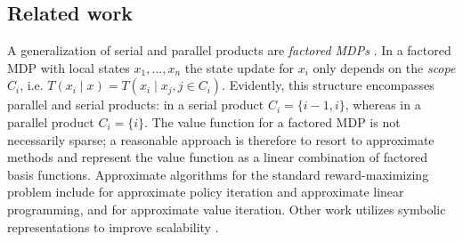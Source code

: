 \documentclass[conference]{IEEEtran}
\begin{document}

\subsection{Related work}

A generalization of serial and parallel products are \emph{factored MDPs} \cite{Boutilier2000}. In a factored MDP with local states $x_1, \ldots, x_n$ the state update for $x_i$ only depends on the \emph{scope} $C_i$, i.e. $T(x_i \mid x) = T(x_i \mid x_j, j \in C_i)$. Evidently, this structure encompasses parallel and serial products: in a serial product $C_i = \{ i-1, i \}$, whereas in a parallel product $C_i = \{ i \}$. The value function for a factored MDP is not necessarily sparse; a reasonable approach is therefore to resort to approximate methods and represent the value function as a linear combination of factored basis functions. Approximate algorithms for the standard reward-maximizing problem include \cite{Guestrin2003} for approximate policy iteration and approximate linear programming, and \cite{Szita2008} for approximate value iteration. Other work utilizes symbolic representations to improve scalability \cite{Boutilier2000}.
\end{document}
